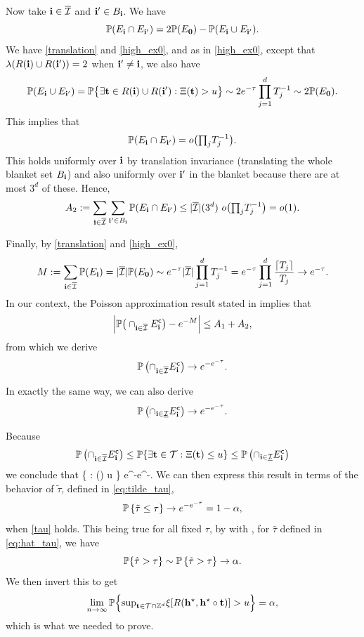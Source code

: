 \documentclass[twoside,11pt]{article}
\begin{document}
Now take $\mathbf{i} \in \overline{\mathcal{I}}$ and $\mathbf{i}' \in B_{\mathbf{i}}$.  
We have
\[
\mathbb{P} ( E_{\mathbf{i}} \cap E_{\mathbf{i}'} ) = 2 \mathbb{P} ( E_{{\bf 0}} ) - \mathbb{P} ( E_{\mathbf{i}} \cup E_{\mathbf{i}'} ).
\]
We have \eqref{translation} and \eqref{high_ex0}, and as in \eqref{high_ex0}, except that $\lambda(R(\mathbf{i}) \cup R(\mathbf{i}')) = 2$ when $\mathbf{i}' \ne \mathbf{i}$, we also have
\[
\mathbb{P} ( E_{\mathbf{i}} \cup E_{\mathbf{i}'} ) = \mathbb{P} \big\{ \exists  \mathbf{t} \in R(\mathbf{i}) \cup R(\mathbf{i}') : \Xi(\mathbf{t}) > u \big\} \sim 2 e^{-\tau} \prod_{j=1}^d T_j^{-1} \sim 2 \mathbb{P} ( E_{{\bf 0}} ).
\]
This implies that 
\[\mathbb{P} ( E_{\mathbf{i}} \cap E_{\mathbf{i}'} ) = o\big( {\textstyle\prod}_j T_j^{-1} \big).\]
This holds uniformly over $\mathbf{i}$ by translation invariance (translating the whole blanket set $B_{\mathbf{i}}$) and also uniformly over $\mathbf{i}'$ in the blanket because there are at most $3^d$ of these. 
Hence,
\[
A_2 := \sum_{\mathbf{i} \in \overline {\mathcal{I}}} \sum_{\mathbf{i}' \in B_{\mathbf{i}}} \mathbb{P} ( E_{\mathbf{i}} \cap E_{\mathbf{i}'} ) \le |\overline {\mathcal{I}}| (3^d) \ o\big( {\textstyle\prod}_j T_j^{-1} \big) = o(1).
\]

Finally, by \eqref{translation} and \eqref{high_ex0},
\[
M := \sum_{\mathbf{i} \in \overline {\mathcal{I}}} \mathbb{P} ( E_{\mathbf{i}} ) = |\overline {\mathcal{I}}| \mathbb{P} ( E_{{\bf 0}} ) \sim e^{-\tau} |\overline {\mathcal{I}}| \prod_{j=1}^d T_j^{-1} = e^{-\tau} \prod_{j=1}^d \frac{\lceil T_j \rceil}{T_j} \rightarrow e^{-\tau}.
\]
In our context, the Poisson approximation result stated in \citep[Th 1]{arratia1989two} implies that
\[
\Big| \mathbb{P}\big(\cap_{\mathbf{i} \in \overline {\mathcal{I}}} E_{\mathbf{i}}^{\mathsf{c}}\big) - e^{-M} \Big| \le A_1 + A_2, 
\]
from which we derive 
\[
\mathbb{P} \left( \cap_{\mathbf{i} \in \overline {\mathcal{I}}} E_{\mathbf{i}}^{\mathsf{c}} \right) \rightarrow e^{-e^{-\tau}}.
\]

In exactly the same way, we can also derive
\[
\mathbb{P} \left( \cap_{\mathbf{i} \in \underline {\mathcal{I}}} E_{\mathbf{i}}^{\mathsf{c}} \right) \rightarrow e^{-e^{-\tau}}.
\]

Because
\[
\mathbb{P} \left( \cap_{\mathbf{i} \in \overline {\mathcal{I}}} E_{\mathbf{i}}^{\mathsf{c}} \right) \le \mathbb{P} \{ \exists \mathbf{t} \in {\mathcal{T}} : \Xi(\mathbf{t}) \le u \} \le \mathbb{P} \left( \cap_{\mathbf{i} \in \underline {\mathcal{I}}} E_{\mathbf{i}}^{\mathsf{c}} \right)
\]
we conclude that 
\beq \label{oracle_Xi}
\PP \{ \exists \tb \in \Tcal : \Xi(\tb) \le u \} \rightarrow e^{-e^{-\tau}}.
\eeq
We can then express this result in terms of the behavior of $\tilde \tau$, defined in \eqref{eq:tilde_tau},
\[
\mathbb{P} \left\{ \tilde \tau \le \tau \right\} \rightarrow e^{-e^{-\tau}} = 1 - \alpha,
\]
when \eqref{tau} holds.
This being true for all fixed $\tau$, by  with , for $\hat \tau$ defined in \eqref{eq:hat_tau}, we have
\[
\mathbb{P} \{ \hat \tau > \tau \} \sim \mathbb{P} \left\{ \tilde \tau > \tau \right\} \to \alpha.
\]
We then invert this to get 
\[
\lim_{n \rightarrow \infty} \mathbb{P} \Big\{ {\textstyle\sup}_{\mathbf{t} \in {\mathcal{T}} \cap \mathbb{Z}^{d}} \xi[R(\mathbf{h}^\star, \mathbf{h}^\star \circ \mathbf{t})] > u \Big\} = \alpha,
\]
which is what we needed to prove.
\end{document}

